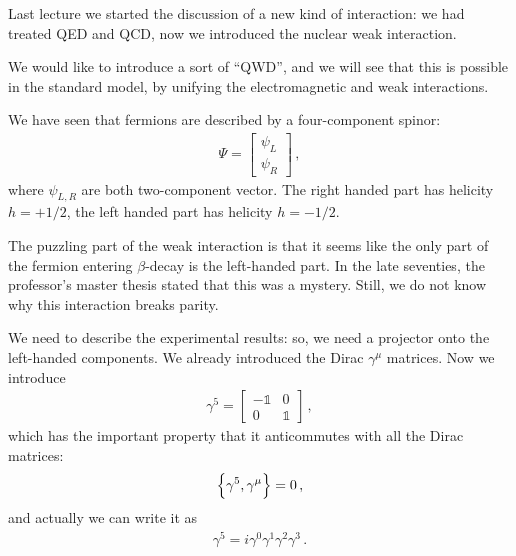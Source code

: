\documentclass[main.tex]{subfiles}
\begin{document}

Last lecture we started the discussion of a new kind of interaction: we had treated QED and QCD, now we introduced the nuclear weak interaction. 

We would like to introduce a sort of ``QWD'', and we will see that this is possible in the standard model, by unifying the electromagnetic and weak interactions. 

We have seen that fermions are described by a four-component spinor: 
%
\begin{align}
\Psi = \left[\begin{array}{c}
\psi_{L} \\ 
\psi_{R}
\end{array}\right]
\,,
\end{align}
%
where \(\psi_{L, R}\) are both two-component vector. The right handed part has helicity \(h = + 1/ 2\), the left handed part has helicity \(h = - 1 / 2\).

The puzzling part of the weak interaction is that it seems like the only part of the fermion entering \(\beta \)-decay is the left-handed part.
In the late seventies, the professor's master thesis stated that this was a mystery. Still, we do not know why this interaction breaks parity. 

We need to describe the experimental results: so, we need a projector onto the left-handed components. 
We already introduced the Dirac \(\gamma^{\mu }\) matrices. 
Now we introduce 
%
\begin{align}
\gamma^{5} = \left[\begin{array}{cc}
- \mathbb{1} & 0 \\ 
0 & \mathbb{1}
\end{array}\right]
\,,
\end{align}
%
which has the important property that it anticommutes with all the Dirac matrices: 
%
\begin{align}
\qty{\gamma^{5}, \gamma^{\mu }} = 0 
\,,
\end{align}
%
and actually we can write it as 
%
\begin{align}
\gamma^{5} = i \gamma^{0}\gamma^{1}\gamma^{2}\gamma^{3}
\,.
\end{align}
\end{document}
